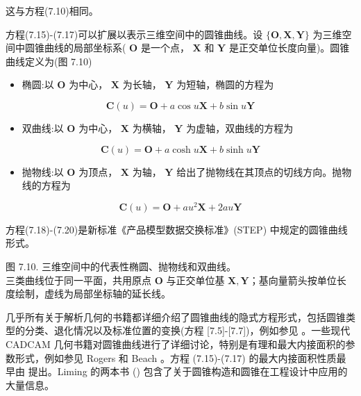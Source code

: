 \documentclass[../main.tex]{subfiles}
\begin{document}
这与方程(7.10)相同。

方程(7.15)-(7.17)可以扩展以表示三维空间中的圆锥曲线。设 \(\{ \mathbf{O},\mathbf{X},\mathbf{Y}\}\) 为三维空间中圆锥曲线的局部坐标系( \(\mathbf{O}\) 是一个点， \(\mathbf{X}\) 和 \(\mathbf{Y}\) 是正交单位长度向量)。圆锥曲线定义为(图 7.10)

\begin{itemize}
\item 椭圆:以 \(\mathbf{O}\) 为中心， \(\mathbf{X}\) 为长轴， \(\mathbf{Y}\) 为短轴，椭圆的方程为
\end{itemize}

\[
\mathbf{C}\left( u\right)  = \mathbf{O} + a\cos u\mathbf{X} + b\sin u\mathbf{Y} \tag{7.18}
\]

\begin{itemize}
\item 双曲线:以 \(\mathbf{O}\) 为中心， \(\mathbf{X}\) 为横轴， \(\mathbf{Y}\) 为虚轴，双曲线的方程为
\end{itemize}

\[
\mathbf{C}\left( u\right)  = \mathbf{O} + a\cosh u\mathbf{X} + b\sinh u\mathbf{Y} \tag{7.19}
\]

\begin{itemize}
\item 抛物线:以 \(\mathbf{O}\) 为顶点， \(\mathbf{X}\) 为轴， \(\mathbf{Y}\) 给出了抛物线在其顶点的切线方向。抛物线的方程为
\end{itemize}

\[
\mathbf{C}\left( u\right)  = \mathbf{O} + a{u}^{2}\mathbf{X} + {2au}\mathbf{Y} \tag{7.20}
\]

方程(7.18)-(7.20)是新标准《产品模型数据交换标准》(STEP)\cite{STEP94} 中规定的圆锥曲线形式。

\begin{center}
\begin{minipage}{18cm}
\vspace*{.6\baselineskip}
\centering
{}
\par\smallskip
图 7.10. 三维空间中的代表性椭圆、抛物线和双曲线。\\
三类曲线位于同一平面，共用原点 $\mathbf O$ 与正交单位基 $\mathbf X,\mathbf Y$；基向量箭头按单位长度绘制，虚线为局部坐标轴的延长线。
\end{minipage}
\end{center}

几乎所有关于解析几何的书籍都详细介绍了圆锥曲线的隐式方程形式，包括圆锥类型的分类、退化情况以及标准位置的变换(方程 [7.5]-[7.7])，例如参见 \cite{Salm79,Coxe80,Ilyi84}。一些现代 CADCAM 几何书籍对圆锥曲线进行了详细讨论，特别是有理和最大内接面积的参数形式，例如参见 Rogers \cite{Roge90} 和 Beach \cite{Beac91}。方程 (7.15)-(7.17) 的最大内接面积性质最早由 \cite{Smit71} 提出。Liming 的两本书 (\cite{Limi44,Limi79}) 包含了关于圆锥构造和圆锥在工程设计中应用的大量信息。
\end{document}
